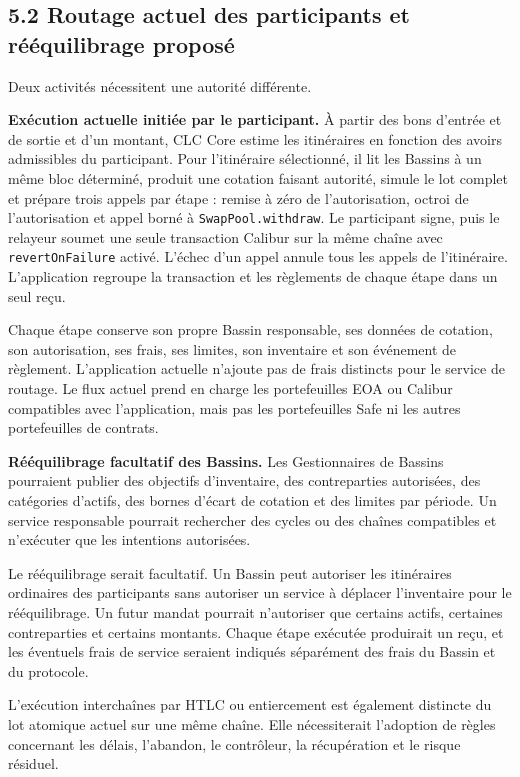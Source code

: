 \documentclass[11pt]{article}
\begin{document}
\subsection*{5.2 Routage actuel des participants et rééquilibrage proposé}

Deux activités nécessitent une autorité différente.

\textbf{Exécution actuelle initiée par le participant.} À partir des bons d'entrée et de sortie et d'un montant, CLC Core estime les itinéraires en fonction des avoirs admissibles du participant. Pour l'itinéraire sélectionné, il lit les Bassins à un même bloc déterminé, produit une cotation faisant autorité, simule le lot complet et prépare trois appels par étape : remise à zéro de l'autorisation, octroi de l'autorisation et appel borné à \texttt{SwapPool.withdraw}. Le participant signe, puis le relayeur soumet une seule transaction Calibur sur la même chaîne avec \texttt{revertOnFailure} activé. L'échec d'un appel annule tous les appels de l'itinéraire. L'application regroupe la transaction et les règlements de chaque étape dans un seul reçu.

Chaque étape conserve son propre Bassin responsable, ses données de cotation, son autorisation, ses frais, ses limites, son inventaire et son événement de règlement. L'application actuelle n'ajoute pas de frais distincts pour le service de routage. Le flux actuel prend en charge les portefeuilles EOA ou Calibur compatibles avec l'application, mais pas les portefeuilles Safe ni les autres portefeuilles de contrats.

\textbf{Rééquilibrage facultatif des Bassins.} Les Gestionnaires de Bassins pourraient publier des objectifs d'inventaire, des contreparties autorisées, des catégories d'actifs, des bornes d'écart de cotation et des limites par période. Un service responsable pourrait rechercher des cycles ou des chaînes compatibles et n'exécuter que les intentions autorisées.

Le rééquilibrage serait facultatif. Un Bassin peut autoriser les itinéraires ordinaires des participants sans autoriser un service à déplacer l'inventaire pour le rééquilibrage. Un futur mandat pourrait n'autoriser que certains actifs, certaines contreparties et certains montants. Chaque étape exécutée produirait un reçu, et les éventuels frais de service seraient indiqués séparément des frais du Bassin et du protocole.

L'exécution interchaînes par HTLC ou entiercement est également distincte du lot atomique actuel sur une même chaîne. Elle nécessiterait l'adoption de règles concernant les délais, l'abandon, le contrôleur, la récupération et le risque résiduel.
\end{document}
